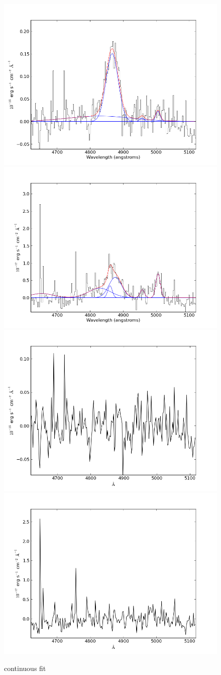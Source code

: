 \documentclass[usenatbib]{mn2e}
\begin{document}
\newpage


\begin{figure}
\begin{center}
\includegraphics[width=0.46\linewidth,angle=0]{Hbeta_6.png}
\vspace{5mm}
\includegraphics[width=0.49\linewidth,angle=0]{Hbeta_7.png}\\
\includegraphics[width=0.46\linewidth,angle=0]{Hbeta_res_6.png}
\hspace{5mm}
\includegraphics[width=0.49\linewidth,angle=0]{Hbeta_res_7.png}\\
\end{center} 
\caption{continuous fit \label{fig:landscape}}   
\end{figure}
\end{document}

